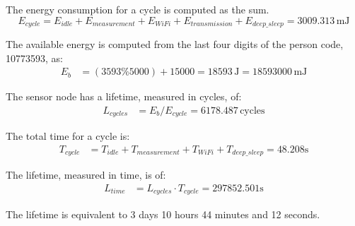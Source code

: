 The energy consumption for a cycle is computed as the sum.
\[
E_{cycle} = E_{idle} + E_{measurement} + E_{WiFi} + E_{transmission} + E_{deep\_sleep} = 3009.313\,\text{mJ} 
\]

The available energy is computed from the last four digits of the person code, 10773593, as: 
\begin{align*}
	E_{b} &= (3593 \% 5000) + 15000 = 18593\,\text{J} = 18593000\,\text{mJ}
\end{align*}

The sensor node has a lifetime, measured in cycles, of:
\begin{align*}
	L_{cycles}&= E_{b}/E_{cycle} = 6178.487 \,\text{cycles} 
\end{align*}

The total time for a cycle is:
\begin{align*}
	T_{cycle} &= T_{idle} + T_{measurement} + T_{WiFi} + T_{deep\_sleep} = 48.208 \text{s}
\end{align*}

The lifetime, measured in time, is of:
\begin{align*}
	L_{time}&= L_{cycles} \cdot T_{cycle} = 297852.501 \text{s}
\end{align*}

The lifetime is equivalent to 3 days 10 hours 44 minutes and 12 seconds.


